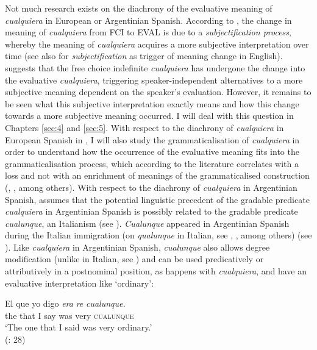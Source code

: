 Not much research exists on the diachrony of the evaluative meaning of \textit{cualquiera} in European or Argentinian Spanish. According to \citet{Company2009}, the change in meaning of \textit{cualquiera} from FCI to EVAL is due to a \textit{subjectification process}, whereby the meaning of \textit{cualquiera} acquires a more subjective interpretation over time (see also \citealt{Traugott1989} for \textit{subjectification} as trigger of meaning change in English). \citet{Company2009} suggests that the free choice indefinite \textit{cualquiera} has undergone the change into the evaluative \textit{cualquiera}, triggering speaker-independent alternatives to a more subjective meaning dependent on the speaker’s evaluation. However, it remains to be seen what this subjective interpretation exactly means and how this change towards a more subjective meaning occurred. I will deal with this question in Chapters \ref{sec:4} and \ref{sec:5}. With respect to the diachrony of \textit{cualquiera} in European Spanish in , I will also study the grammaticalisation of \textit{cualquiera} in order to understand how the occurrence of the evaluative meaning fits into the grammaticalisation process, which according to the literature correlates with a loss and not with an enrichment of meanings of the grammaticalised construction (\citealt{Traugott1989}, \citealt{Heine1991}, among others). With respect to the diachrony of \textit{cualquiera} in Argentinian Spanish, \citet{Rizzosalierno2013} assumes that the potential linguistic precedent of the gradable predicate \textit{cualquiera} in Argentinian Spanish is possibly related to the gradable predicate \textit{cualunque}, an Italianism (see ). \textit{Cualunque} appeared in Argentinian Spanish during the Italian immigration (on \textit{qualunque} in Italian, see \citealt{Chierchia2006}, \citealt{AloniEtAl2010}, among others) (see ). Like \textit{cualquiera} in Argentinian Spanish, \textit{cualunque} also allows degree modification (unlike in Italian, see \cite{Kellert-francia-2023}) and can be used predicatively or attributively in a postnominal position, as happens with \textit{cualquiera}, and have an evaluative interpretation like ‘ordinary’:

\ea \label{ex:key:119} %
  \gll El que yo digo \textit{era} \textit{re} \textit{cualunque.}\\
  the that I say was very \textsc{cualunque}\\
  \glt ‘The one that I said was very ordinary.’\\
  (\citealt{Rizzosalierno2013}: 28)
\z 

